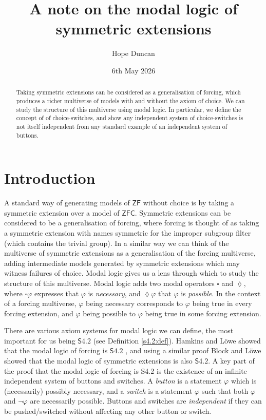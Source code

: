 \documentclass[a4paper,11pt]{amsart}
\title{A note on the modal logic of symmetric extensions}
\author{Hope Duncan}
\date{6th May 2026}
\theoremstyle{definition}
\newcommand{\ZF}{\mathsf{ZF}}
\newcommand{\ZFC}{\mathsf{ZFC}}
\newcommand{\Sf}{\mathsf{S}4.2}
\begin{document}
\begin{abstract}

    Taking symmetric extensions can be considered as a generalisation of forcing, which produces a richer multiverse of models with and without the axiom of choice. We can study the structure of this multiverse using modal logic. In particular, we define the concept of of choice-switches, and show any independent system of choice-switches is not itself independent from any standard example of an independent system of buttons.
\end{abstract}

\maketitle

\section{Introduction}

A standard way of generating models of $\ZF$ without choice is by taking a symmetric extension over a model of $\ZFC$. Symmetric extensions can be considered to be a generalisation of forcing, where forcing is thought of as taking a symmetric extension with names symmetric for the improper subgroup filter (which contains the trivial group). In a similar way we can think of the multiverse of symmetric extensions as a generalisation of the forcing multiverse, adding intermediate models generated by symmetric extensions which may witness failures of choice. Modal logic gives us a lens through which to study the structure of this multiverse. Modal logic adds two modal operators $\square$ and $\lozenge$, where $\square \varphi$ expresses that $\varphi$ is \emph{necessary}, and $\lozenge \varphi$ that $\varphi$ is \emph{possible}. In the context of a forcing multiverse, $\varphi$ being necessary corresponds to $\varphi$ being true in every forcing extension, and $\varphi$ being possible to $\varphi$ being true in some forcing extension. 

There are various axiom systems for modal logic we can define, the most important for us being $\Sf$ (see Definition \ref{s4.2:def}). Hamkins and Löwe showed that the modal logic of forcing is $\Sf$ \cite{Hamkins-modal-logic}, and using a similar proof Block and Löwe showed that the modal logic of symmetric extensions is also $\Sf$. A key part of the proof that the modal logic of forcing is S4.2 is the existence of an infinite independent system of buttons and switches. A \emph{button} is a statement $\varphi$ which is (necessarily) possibly necessary, and a \emph{switch} is a statement $\varphi$ such that both $\varphi$ and $\neg\varphi$ are necessarily possible. Buttons and switches are \emph{independent} if they can be pushed/switched without affecting any other button or switch. 
\end{document}
